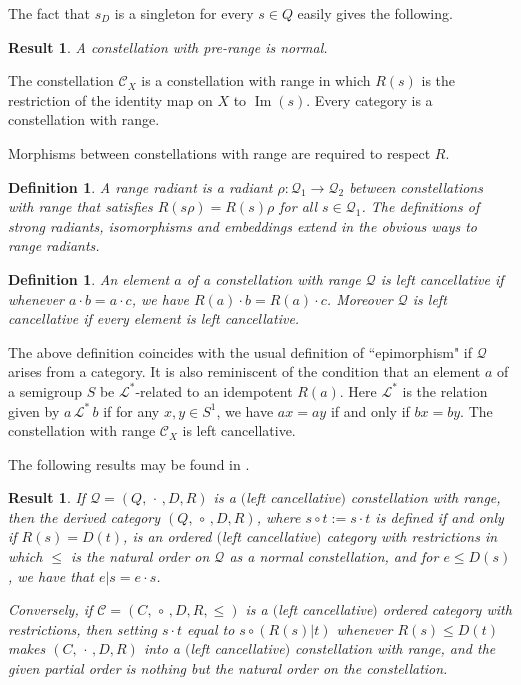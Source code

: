 \documentclass[12pt]{amsart}
\newtheorem{dfn}[thm]{Definition}
\newtheorem{result}[thm]{Result}
\theoremstyle{definition}
\newcommand{\Q}{\mathcal Q}
\newcommand{\C}{\mathcal C}
\DeclareMathOperator{\Img}{Im}
\begin{document}
The fact that $s_D$ is a singleton for every $s\in Q$ easily gives the following. 

\begin{result} \cite{constgen}  \label{Rlaws} A 
constellation with pre-range is normal.
\end{result}

The constellation $\C_X$ is a constellation with range in which $R(s)$ is the restriction of the identity map on $X$ to $\Img(s)$.  Every category is a constellation with range.

Morphisms between constellations with range are required to respect $R$.

\begin{dfn}
A {\em range radiant} is a radiant $\rho:\Q_1\rightarrow \Q_2$ between constellations with range that satisfies $R(s\rho)=R(s)\rho$ for all $s\in \Q_1$.  The definitions of strong radiants, isomorphisms and embeddings extend in the obvious ways to range radiants.  
\end{dfn} 

\begin{dfn}
An element $a$ of a constellation with range $\Q$ is {\em left cancellative} if whenever $a\cdot b=a\cdot c$, we have $R(a)\cdot b=R(a)\cdot c$.  Moreover $\Q$ is {\em left cancellative} if every element is left cancellative.
\end{dfn}

The above definition coincides with the usual definition of  ``epimorphism" if $\Q$ arises from a category.  It is also reminiscent of the condition that
an element $a$ of a semigroup $S$ be $\mathcal{L}^*$-related to an idempotent $R(a)$. Here  $\mathcal{L}^*$ is the relation given by $a\,\mathcal{L}^*\, b$ if  for any $x,y\in S^1$, we have $ax=ay$ if and only if $bx=by$. The constellation with range $\C_X$ is left cancellative. 

The following results may be found in \cite{constrange}.

\begin{result}   \label{corresp}
If $\Q=(Q,\, \cdot\, ,D,R)$ is a $($left cancellative$)$ constellation with range, then the derived category $(Q,\, \circ\, ,D,R)$, where $s\circ t:=s\cdot t$ is defined if and only if $R(s)=D(t)$, is an ordered $($left cancellative$)$ category with restrictions in which $\leq$ is the natural order on $\Q$ as a normal constellation, and for $e\leq D(s)$, we have that $e|s=e\cdot s$.

Conversely, if $\C=(C,\, \circ\, ,D,R,\leq)$ is a $($left cancellative$)$ ordered category with restrictions, then setting $s\cdot t$ equal to $s\circ (R(s)|t)$ whenever $R(s)\leq D(t)$ makes $(C,\, \cdot\, ,D,R)$ into a $($left cancellative$)$ constellation with range, and the given partial order is nothing but the natural order on the constellation.  
\end{result} 
\end{document}
